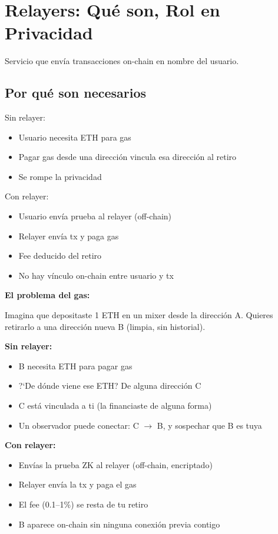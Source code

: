 \documentclass[11pt,a4paper,twoside]{book}
\begin{document}
\vspace{1cm}

\section{Relayers: Qu\'e son, Rol en Privacidad}

\begin{definition}[Relayer]
Servicio que env\'ia transacciones on-chain en nombre del usuario.
\end{definition}

\subsection{Por qu\'e son necesarios}

Sin relayer:
\begin{itemize}
    \item Usuario necesita ETH para gas
    \item Pagar gas desde una direcci\'on vincula esa direcci\'on al retiro
    \item Se rompe la privacidad
\end{itemize}

Con relayer:
\begin{itemize}
    \item Usuario env\'ia prueba al relayer (off-chain)
    \item Relayer env\'ia tx y paga gas
    \item Fee deducido del retiro
    \item No hay v\'inculo on-chain entre usuario y tx
\end{itemize}

\begin{intuicion}
\textbf{El problema del gas:}

Imagina que depositaste 1 ETH en un mixer desde la direcci\'on A.
Quieres retirarlo a una direcci\'on nueva B (limpia, sin historial).

\textbf{Sin relayer:}
\begin{itemize}
    \item B necesita ETH para pagar gas
    \item ?`De d\'onde viene ese ETH? De alguna direcci\'on C
    \item C est\'a vinculada a ti (la financiaste de alguna forma)
    \item Un observador puede conectar: C $\to$ B, y sospechar que B es tuya
\end{itemize}

\textbf{Con relayer:}
\begin{itemize}
    \item Env\'ias la prueba ZK al relayer (off-chain, encriptado)
    \item Relayer env\'ia la tx y paga el gas
    \item El fee (0.1--1\%) se resta de tu retiro
    \item B aparece on-chain sin ninguna conexi\'on previa contigo
\end{itemize}
\end{intuicion}
\end{document}
